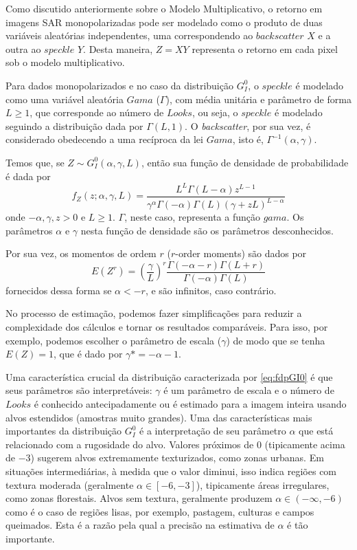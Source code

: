 \documentclass[12pt]{article}
\begin{document}
Como discutido anteriormente sobre o Modelo Multiplicativo, o retorno em imagens SAR monopolarizadas pode ser modelado como o produto de duas variáveis aleatórias independentes, uma correspondendo ao $backscatter$ $X$ e a outra ao $speckle$ $Y$. Desta maneira, $Z = XY$ representa o retorno em cada pixel sob o modelo multiplicativo. 

Para dados monopolarizados e no caso da distribuição $G_I^0$, o $speckle$ é modelado como uma variável aleatória $Gama$ ($\Gamma$), com média unitária e parâmetro de forma $L \geq 1$, que corresponde ao número de $Looks$, ou seja, o $speckle$ é modelado seguindo a distribuição dada por $\Gamma(L,1)$. O \textit{backscatter}, por sua vez, é considerado obedecendo a uma recíproca da lei $Gama$, isto é, $\Gamma^{-1}(\alpha,\gamma)$. 

Temos que, se $Z \sim G_I^0(\alpha, \gamma, L)$, então sua função de densidade de probabilidade é dada por
\begin{equation}
    f_Z(z; \alpha, \gamma, \textit{L})= \frac{L^L\Gamma(L-\alpha)z^{L-1}}{\gamma^\alpha\Gamma(-\alpha)\Gamma(L)(\gamma + zL)^{L-\alpha}} \label{eq:fdpGI0}
\end{equation}
onde $-\alpha, \gamma, z > 0$ e $L \geq 1$. $\Gamma$, neste caso, representa a função $gama$. Os parâmetros $\alpha$ e $\gamma$ nesta função de densidade são os parâmetros desconhecidos.

Por sua vez, os momentos de ordem $r$ ($r$-order moments) são dados por
\begin{equation}
    E(Z^r) = \left (\frac{\gamma}{L}\right )^{r}\frac{\Gamma(-\alpha-r)\Gamma(L+r)}{\Gamma(-\alpha)\Gamma(L)} \label{eq:moments}
\end{equation}
fornecidos dessa forma se $\alpha < -r$, e são infinitos, caso contrário.

No processo de estimação, podemos fazer simplificações para reduzir a complexidade dos cálculos e tornar os resultados comparáveis. Para isso, por exemplo, podemos escolher o parâmetro de escala ($\gamma$) de modo que se tenha $E(Z) = 1$, que é dado por $\gamma* = -\alpha - 1$. 

Uma característica crucial da distribuição caracterizada por \eqref{eq:fdpGI0} é que seus parâmetros são interpretáveis: $\gamma$ é um parâmetro de escala e o número de $Looks$ é conhecido antecipadamente ou é estimado para a imagem inteira usando alvos estendidos (amostras muito grandes). Uma das características mais importantes da distribuição $G_I^0$ é a interpretação de seu parâmetro $\alpha$ que está relacionado com a rugosidade do alvo. Valores próximos de $0$ (tipicamente acima de $-3$) sugerem alvos extremamente texturizados, como zonas urbanas. Em situações intermediárias, à medida que o valor diminui, isso indica regiões com textura moderada (geralmente $\alpha \in  [−6, −3]$), tipicamente áreas irregulares, como zonas florestais. Alvos sem textura, geralmente produzem $\alpha \in (−\infty, −6)$ como é o caso de regiões lisas, por exemplo, pastagem, culturas e campos queimados. Esta é a razão pela qual a precisão na estimativa de $\alpha$ é tão importante.
\end{document}

